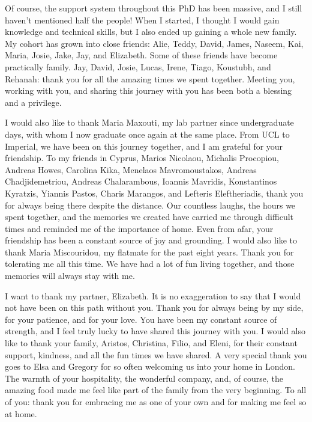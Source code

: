 \documentclass[12pt, a4paper, twoside]{report}
\begin{document}
Of course, the support system throughout this PhD has been massive, and I still haven’t mentioned half the people! When I started, I thought I would gain knowledge and technical skills, but I also ended up gaining a whole new family. My cohort has grown into close friends: Alie, Teddy, David, James, Naseem, Kai, Maria, Josie, Jake, Jay, and Elizabeth.  Some of these friends have become practically family. Jay, David, Josie, Lucas, Irene, Tiago, Koustubh, and Rehanah: thank you for all the amazing times we spent together. Meeting you, working with you, and sharing this journey with you has been both a blessing and a privilege.  

I would also like to thank Maria Maxouti, my lab partner since undergraduate days, with whom I now graduate once again at the same place. From UCL to Imperial, we have been on this journey together, and I am grateful for your friendship. To my friends in Cyprus, Marios Nicolaou, Michalis Procopiou, Andreas Howes, Carolina Kika, Menelaos Mavromoustakos, Andreas Chadjidemetriou, Andreas Chalarambous, Ioannis Mavridis, Konstantinos Kyratzis, Yiannis Pastos, Charis Marangos, and Lefteris Eleftheriadis, thank you for always being there despite the distance. Our countless laughs, the hours we spent together, and the memories we created have carried me through difficult times and reminded me of the importance of home. Even from afar, your friendship has been a constant source of joy and grounding.  I would also like to thank Maria Miscouridou, my flatmate for the past eight years. Thank you for tolerating me all this time. We have had a lot of fun living together, and those memories will always stay with me.  

I want to thank my partner, Elizabeth. It is no exaggeration to say that I would not have been on this path without you. Thank you for always being by my side, for your patience, and for your love. You have been my constant source of strength, and I feel truly lucky to have shared this journey with you.  I would also like to thank your family, Aristos, Christina, Filio, and Eleni, for their constant support, kindness, and all the fun times we have shared. A very special thank you goes to Elsa and Gregory for so often welcoming us into your home in London. The warmth of your hospitality, the wonderful company, and, of course, the amazing food made me feel like part of the family from the very beginning. To all of you: thank you for embracing me as one of your own and for making me feel so at home.  
\end{document}
